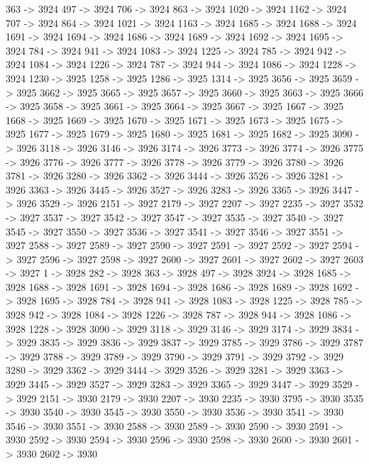{	363 -> 3924
	497 -> 3924
	706 -> 3924
	863 -> 3924
	1020 -> 3924
	1162 -> 3924
	707 -> 3924
	864 -> 3924
	1021 -> 3924
	1163 -> 3924
	1685 -> 3924
	1688 -> 3924
	1691 -> 3924
	1694 -> 3924
	1686 -> 3924
	1689 -> 3924
	1692 -> 3924
	1695 -> 3924
	784 -> 3924
	941 -> 3924
	1083 -> 3924
	1225 -> 3924
	785 -> 3924
	942 -> 3924
	1084 -> 3924
	1226 -> 3924
	787 -> 3924
	944 -> 3924
	1086 -> 3924
	1228 -> 3924
	1230 -> 3925
	1258 -> 3925
	1286 -> 3925
	1314 -> 3925
	3656 -> 3925
	3659 -> 3925
	3662 -> 3925
	3665 -> 3925
	3657 -> 3925
	3660 -> 3925
	3663 -> 3925
	3666 -> 3925
	3658 -> 3925
	3661 -> 3925
	3664 -> 3925
	3667 -> 3925
	1667 -> 3925
	1668 -> 3925
	1669 -> 3925
	1670 -> 3925
	1671 -> 3925
	1673 -> 3925
	1675 -> 3925
	1677 -> 3925
	1679 -> 3925
	1680 -> 3925
	1681 -> 3925
	1682 -> 3925
	3090 -> 3926
	3118 -> 3926
	3146 -> 3926
	3174 -> 3926
	3773 -> 3926
	3774 -> 3926
	3775 -> 3926
	3776 -> 3926
	3777 -> 3926
	3778 -> 3926
	3779 -> 3926
	3780 -> 3926
	3781 -> 3926
	3280 -> 3926
	3362 -> 3926
	3444 -> 3926
	3526 -> 3926
	3281 -> 3926
	3363 -> 3926
	3445 -> 3926
	3527 -> 3926
	3283 -> 3926
	3365 -> 3926
	3447 -> 3926
	3529 -> 3926
	2151 -> 3927
	2179 -> 3927
	2207 -> 3927
	2235 -> 3927
	3532 -> 3927
	3537 -> 3927
	3542 -> 3927
	3547 -> 3927
	3535 -> 3927
	3540 -> 3927
	3545 -> 3927
	3550 -> 3927
	3536 -> 3927
	3541 -> 3927
	3546 -> 3927
	3551 -> 3927
	2588 -> 3927
	2589 -> 3927
	2590 -> 3927
	2591 -> 3927
	2592 -> 3927
	2594 -> 3927
	2596 -> 3927
	2598 -> 3927
	2600 -> 3927
	2601 -> 3927
	2602 -> 3927
	2603 -> 3927
	1 -> 3928
	282 -> 3928
	363 -> 3928
	497 -> 3928
	3924 -> 3928
	1685 -> 3928
	1688 -> 3928
	1691 -> 3928
	1694 -> 3928
	1686 -> 3928
	1689 -> 3928
	1692 -> 3928
	1695 -> 3928
	784 -> 3928
	941 -> 3928
	1083 -> 3928
	1225 -> 3928
	785 -> 3928
	942 -> 3928
	1084 -> 3928
	1226 -> 3928
	787 -> 3928
	944 -> 3928
	1086 -> 3928
	1228 -> 3928
	3090 -> 3929
	3118 -> 3929
	3146 -> 3929
	3174 -> 3929
	3834 -> 3929
	3835 -> 3929
	3836 -> 3929
	3837 -> 3929
	3785 -> 3929
	3786 -> 3929
	3787 -> 3929
	3788 -> 3929
	3789 -> 3929
	3790 -> 3929
	3791 -> 3929
	3792 -> 3929
	3280 -> 3929
	3362 -> 3929
	3444 -> 3929
	3526 -> 3929
	3281 -> 3929
	3363 -> 3929
	3445 -> 3929
	3527 -> 3929
	3283 -> 3929
	3365 -> 3929
	3447 -> 3929
	3529 -> 3929
	2151 -> 3930
	2179 -> 3930
	2207 -> 3930
	2235 -> 3930
	3795 -> 3930
	3535 -> 3930
	3540 -> 3930
	3545 -> 3930
	3550 -> 3930
	3536 -> 3930
	3541 -> 3930
	3546 -> 3930
	3551 -> 3930
	2588 -> 3930
	2589 -> 3930
	2590 -> 3930
	2591 -> 3930
	2592 -> 3930
	2594 -> 3930
	2596 -> 3930
	2598 -> 3930
	2600 -> 3930
	2601 -> 3930
	2602 -> 3930
}
